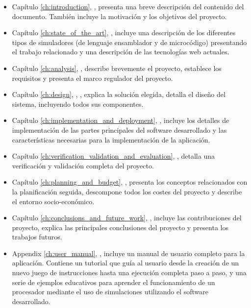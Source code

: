 \begin{itemize}

\item Capítulo \ref{ch:introduction}, \textit{}, presenta una breve descripción del contenido del documento. También incluye la motivación y los objetivos del proyecto.

\item Capítulo \ref{ch:state_of_the_art}, \textit{}, incluye una descripción de los diferentes tipos de simuladores (de lenguaje ensamblador y de microcódigo) presentando el trabajo relacionado y una descripción de las tecnologías web actuales.

\item Capítulo \ref{ch:analysis}, \textit{}, describe brevemente el proyecto, establece los requisitos y presenta el marco regulador del proyecto.

\item Capítulo \ref{ch:design}, \textit{}, , explica la solución elegida, detalla el diseño del sistema, incluyendo todos sus componentes.

\item Capítulo \ref{ch:implementation_and_deployment}, \textit{}, incluye los detalles de implementación de las partes principales del software desarrollado y las características necesarias para la implementación de la aplicación.

\item Capítulo \ref{ch:verification_validation_and_evaluation}, \textit{}, detalla una verificación y validación completa del proyecto.

\item Capítulo \ref{ch:planning_and_budget}, \textit{}, presenta los conceptos relacionados con la planificación seguida, descompone todos los costes del proyecto y describe el entorno socio-económico.

\item Capítulo \ref{ch:conclusions_and_future_work}, \textit{}, incluye las contribuciones del proyecto, explica las principales conclusiones del proyecto y presenta los trabajos futuros.

\item Appendix \ref{ch:user_manual}, \textit{}, incluye un manual de usuario completo para la aplicación. Contiene un tutorial que guía al usuario desde la creación de un nuevo juego de instrucciones hasta una ejecución completa paso a paso, y una serie de ejemplos educativos para aprender el funcionamiento de un procesador mediante el uso de simulaciones utilizando el software desarrollado. 

\end{itemize}

